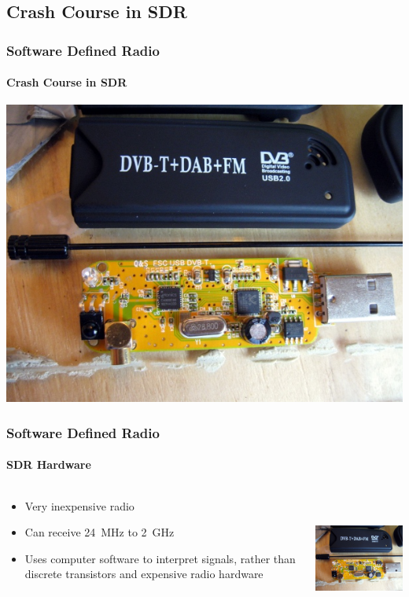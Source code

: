 \documentclass[]{beamer}
\begin{document}
\subsection{Crash Course in SDR}
\begin{frame}
    \frametitle{Software Defined Radio}
    \framesubtitle{Crash Course in SDR}
    \begin{center}
        \includegraphics[width=0.75\paperwidth,height=1.0\paperheight,keepaspectratio]{images/rtlsdr.jpg}
    \end{center}
\end{frame}
\begin{frame}
    \frametitle{Software Defined Radio}
    \framesubtitle{SDR Hardware}
    \begin{columns}[T]
        \begin{column}[T]{5cm}
            \begin{itemize}
                \item{Very inexpensive radio}
                \item{Can receive 24~MHz to 2~GHz}
                \item{Uses computer software to interpret signals, rather than discrete transistors and expensive radio hardware}
            \end{itemize}
        \end{column}
        \begin{column}[T]{5cm}
            \includegraphics[height=4cm]{images/rtlsdr.jpg}
        \end{column}
    \end{columns}
\end{frame}
\end{document}

